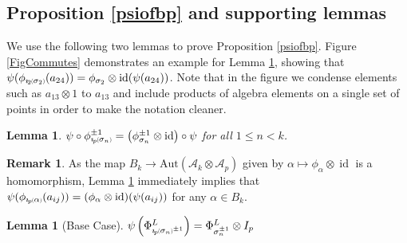 \documentclass[11pt]{amsart}
\def\A{{\mathcal A}}
\def\s{{\sigma}}
\def\fp{{\scriptstyle \bar{\bar{p}}}}
\newcommand*{\subsmallp}[1]{\scalebox{.5}{\ensuremath#1}}
\newcommand{\subpp}[2][p]{\imath_{\hspace*{-1pt}#1}\hspace*{-.5pt}\subsmallp(#2\subsmallp)}
\newcommand\id{\operatorname{id}}
\newtheorem{lem}[thm]{Lemma}
\theoremstyle{definition}
\newtheorem{rem}[thm]{Remark}
\begin{document}

\subsection{Proposition \ref{psiofbp} and supporting lemmas}
\label{PropAndLemmas}

\noindent We use the following two lemmas to prove Proposition \ref{psiofbp}.  Figure \ref{FigCommutes} demonstrates an example for Lemma \ref{commutes}, showing that $\psi(\phi_{\subpp[2]{\s_2}}(a_{24})) = \phi_{\s_2}\otimes\id(\psi(a_{24}))$.  Note that in the figure we condense elements such as $a_{13}\otimes 1$ to $a_{13}$ and include products of algebra elements on a single set of points in order to make the notation cleaner.


\begin{lem}\label{commutes}
$\psi\circ\phi^{\pm 1}_{\subpp{\s_n}} = \left(\phi^{\pm 1}_{\s_n}\otimes \id\right)\circ\psi$ for all $1\le n < k$.
\end{lem}

\begin{rem}As the map $B_{k} \to \text{Aut}(\A_k\otimes\A_p)$ given by $\alpha \mapsto \phi_\alpha\otimes\id$ is a homomorphism, Lemma \ref{commutes} immediately implies that $\psi(\phi_{\subpp\alpha}(a_{ij})) = (\phi_{\alpha} \otimes \id)(\psi(a_{ij}))$ for any $\alpha\in B_k$.
\end{rem}

\begin{lem}[Base Case]\label{basecase}
$\psi\left(\Phi_{\subpp{\s_n}^{\pm 1}}^L\right) = \Phi_{\s_n^{\pm 1}}^L\otimes I_p$
\end{lem}
\end{document}

